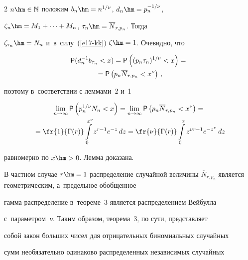 \begin{multicols}{2}
$n\hm\in\mathbb{N}$ положим $b_n\hm=n^{1/\nu}$, $d_n\hm=p_n^{-1/\nu}$,


$\zeta_n\hm=M_1+\cdots+M_n$, $\tau_n\hm=\overline N_{r,p_n}$. Тогда


$\zeta_{\tau_n}\hm=N_n$ и~в~силу~(\ref{e17-kk}) $\zeta\hm=1$. Очевидно, что


\begin{multline*}


{\sf P}(d_n^{-1}b_{\tau_n}<x)={\sf


P}\left((p_n\tau_n)^{1/\nu}<x\right)={}\\


{}={\sf P}\left(p_n\overline


N_{r,p_n}<x^{\nu}\right)\,,


\end{multline*}


поэтому в~соответствии с леммами~2 и~1


\begin{multline*}


\lim\limits_{n\to\infty}{\sf P}\left(p_n^{1/\nu}N_n<x\right)=


\lim\limits_{n\to\infty}{\sf


P}\left(p_n\overline


N_{r,p_n}<x^{\nu}\right)={}\\


{}=\fr{1}{\Gamma(r)}\int\limits_{0}^{x^{\nu}}z^{r-1}e^{-z}\,dz=


\fr{\nu}{\Gamma(r)}\int\limits _{0}^{x}z^{\nu r-1}e^{-z^{\nu}}\,dz


\end{multline*}


равномерно по $x\hm>0$. Лемма доказана.





\smallskip





В частном случае $r\hm=1$ распределение случайной величины $\overline


N_{r,p_n}$ является геометрическим, а~предельное обобщенное


гам\-ма-рас\-пре\-де\-ле\-ние в~тео\-ре\-ме~3 является распределением Вейбулла 


с~параметром~$\nu$. Таким образом, теорема~3, по сути, представляет


собой закон больших чисел для отрицательных биномиальных случайных


сумм необязательно одинаково распределенных независимых случайных



\end{multicols}
